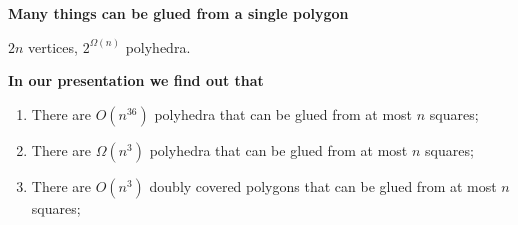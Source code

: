 \documentclass[11pt]{article}
\begin{document}








\newpage \begin{center}
	{\Large\bfseries Many things can be glued from a single polygon} \vspace{0.65cm}

   \vspace{0.65cm}

$2n$ vertices, $2^{\Omega(n)}$ polyhedra.
\end{center}


\newpage \begin{center}
	{\Large\bfseries In our presentation we find out that}
\end{center} \vspace{1cm}

\begin{enumerate}
	\item There are $O(n^{36})$ polyhedra that can be glued from at most $n$ squares; \medskip
	\item There are $\Omega(n^3)$ polyhedra that can be glued from at most $n$ squares; \medskip
	\item There are $O(n^3)$ doubly covered polygons that can be glued from at most $n$ squares;
\end{enumerate}
\end{document}
